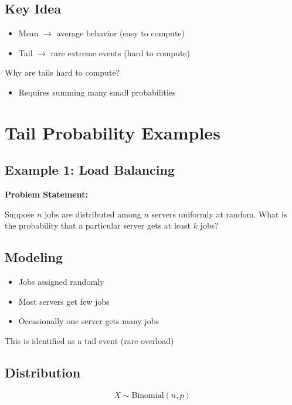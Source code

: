 \documentclass{article}
\begin{document}
\subsection{Key Idea}

\begin{itemize}
    \item Mean $\rightarrow$ average behavior (easy to compute)
    \item Tail $\rightarrow$ rare extreme events (hard to compute)
\end{itemize}

Why are tails hard to compute?

\begin{itemize}
    \item Requires summing many small probabilities
\end{itemize}

\section{Tail Probability Examples}

\subsection{Example 1: Load Balancing}

\textbf{Problem Statement:}

Suppose $n$ jobs are distributed among $n$ servers uniformly at random.  
What is the probability that a particular server gets at least $k$ jobs?

\subsection{Modeling}

\begin{itemize}
    \item Jobs assigned randomly
    \item Most servers get few jobs
    \item Occasionally one server gets many jobs
\end{itemize}

This is identified as a tail event (rare overload)

\subsection{Distribution}

\begin{equation}
X \sim \text{Binomial}(n, p)
\end{equation}
\end{document}
